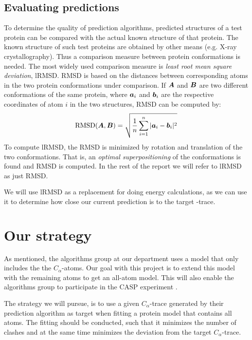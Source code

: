 \subsection{Evaluating predictions}
\label{sec:eval-predictions}
To determine the quality of prediction algorithms, predicted
structures of a test protein can be compared with the actual known
structure of that protein. The known structure of such test proteins
are obtained by other means (e.g. X-ray crystallography).  Thus a
comparison measure between protein conformations is needed. The most
widely used comparison measure is \textit{least root mean square
  deviation}, lRMSD. RMSD is based on the distances between
corresponding atoms in the two protein conformations under comparison.
If $\boldsymbol{A}$ and $\boldsymbol{B}$ are two different conformations of the same
protein, where $\boldsymbol{a}_i$ and $\boldsymbol{b}_i$ are the respective
coordinates of atom $i$ in the two structures, RMSD can be computed
by:
\begin{equation}
  \label{eq:rmsd}
  \text{RMSD}(\boldsymbol{A}, \boldsymbol{B}) = \sqrt{\frac{1}{n}\sum_{i=1}^n |\boldsymbol{a}_i - \boldsymbol{b}_i|^2}
\end{equation}
To compute lRMSD, the RMSD is minimized by rotation and
translation of the two conformations. That is, an
\textit{optimal superpositioning} of the conformations is found and
RMSD is computed. In the rest of the report we will refer to lRMSD as
just RMSD.

We will use lRMSD as a replacement for doing energy calculations, as
we can use it to determine how close our current prediction is to the
target \Ca-trace.



\section{Our strategy}
As mentioned, the algorithms group at our department uses a model that
only includes the the $C_\alpha$-atoms. Our goal with this project is
to extend this model with the remaining atoms to get an all-atom
model.  This will also enable the algorithms group to participate in
the CASP experiment \cite{caspwebsite}.

The strategy we will pursue, is to use a given $C_\alpha$-trace
generated by their prediction algorithm as target when fitting a
protein model that contains all atoms. The fitting should be conducted,
such that it minimizes the number of clashes and at the same time
minimizes the deviation from the target $C_\alpha$-trace.

